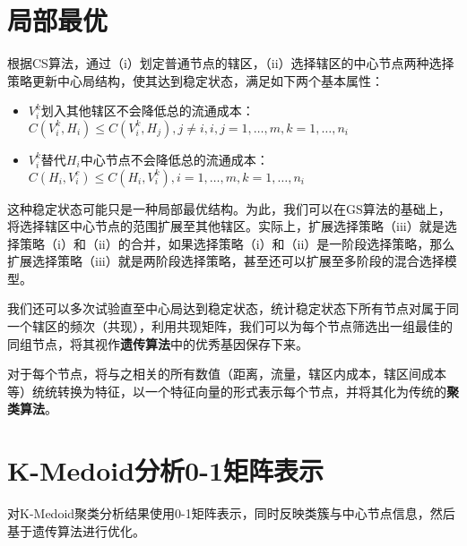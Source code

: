 \section{局部最优}
根据CS算法，通过（i）划定普通节点的辖区，（ii）选择辖区的中心节点两种选择策略更新中心局结构，使其达到稳定状态，满足如下两个基本属性：
\begin{itemize}
  \item $V_i^k$划入其他辖区不会降低总的流通成本：$C(V_i^k, H_i) \le C(V_i^k, H_j), j\ne i, i,j=1,\ldots,m,k=1,\ldots,n_i$
  \item $V_i^k$替代$H_i$中心节点不会降低总的流通成本：$C(H_i, V_i^c) \le C(H_i, V_i^k), i = 1,\ldots,m, k=1,\ldots,n_i$
\end{itemize}
这种稳定状态可能只是一种局部最优结构。为此，我们可以在GS算法的基础上，将选择辖区中心节点的范围扩展至其他辖区。实际上，扩展选择策略（iii）就是选择策略（i）和（ii）的合并，如果选择策略（i）和（ii）是一阶段选择策略，那么扩展选择策略（iii）就是两阶段选择策略，甚至还可以扩展至多阶段的混合选择模型。

我们还可以多次试验直至中心局达到稳定状态，统计稳定状态下所有节点对属于同一个辖区的频次（共现），利用共现矩阵，我们可以为每个节点筛选出一组最佳的同组节点，将其视作\textbf{遗传算法}中的优秀基因保存下来。

对于每个节点，将与之相关的所有数值（距离，流量，辖区内成本，辖区间成本等）统统转换为特征，以一个特征向量的形式表示每个节点，并将其化为传统的\textbf{聚类算法}。

\section{K-Medoid分析0-1矩阵表示}
对K-Medoid聚类分析结果使用0-1矩阵表示，同时反映类簇与中心节点信息，然后基于遗传算法进行优化。
